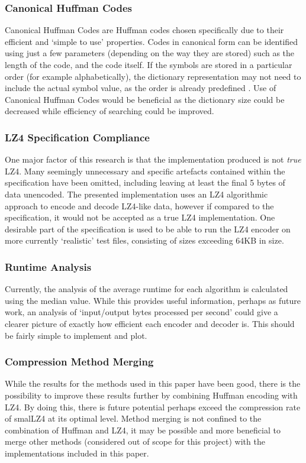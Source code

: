 \documentclass[12pt]{article}
\begin{document}
\subsubsection{Canonical Huffman Codes}
Canonical Huffman Codes are Huffman codes chosen specifically due to their efficient and `simple to use' properties. Codes in canonical form can be identified using just a few parameters (depending on the way they are stored) such as the length of the code, and the code itself. If the symbols are stored in a particular order (for example alphabetically), the dictionary representation may not need to include the actual symbol value, as the order is already predefined \citep[pp.~84-88]{dc_complete_ref}. Use of Canonical Huffman Codes would be beneficial as the dictionary size could be decreased while efficiency of searching could be improved.

\subsubsection{LZ4 Specification Compliance}
One major factor of this research is that the implementation produced is not \emph{true} LZ4. Many seemingly unnecessary and specific artefacts contained within the specification have been omitted, including leaving at least the final 5 bytes of data unencoded. The presented implementation uses an LZ4 algorithmic approach to encode and decode LZ4-like data, however if compared to the specification, it would not be accepted as a true LZ4 implementation. One desirable part of the specification is used to be able to run the LZ4 encoder on more currently `realistic' test files, consisting of sizes exceeding 64KB in size.

\subsubsection{Runtime Analysis}
Currently, the analysis of the average runtime for each algorithm is calculated using the median value. While this provides useful information, perhaps as future work, an analysis of `input/output bytes processed per second' could give a clearer picture of exactly how efficient each encoder and decoder is. This should be fairly simple to implement and plot.

\subsubsection{Compression Method Merging}
While the results for the methods used in this paper have been good, there is the possibility to improve these results further by combining Huffman encoding with LZ4. By doing this, there is future potential perhaps exceed the compression rate of smalLZ4 at its optimal level. Method merging is not confined to the combination of Huffman and LZ4, it may be possible and more beneficial to merge other methods (considered out of scope for this project) with the implementations included in this paper. 
\end{document}
